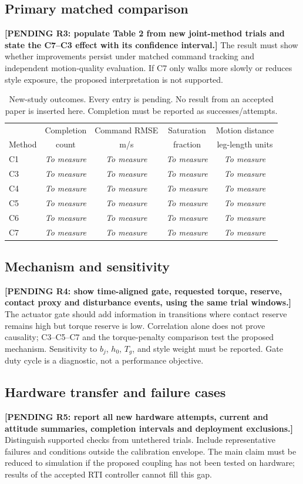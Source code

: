 \documentclass[11pt,a4paper]{article}
\newcommand{\pending}[1]{\textbf{[PENDING #1]}}
\newcommand{\TBC}{\textit{To measure}}
\begin{document}
\subsection{Primary matched comparison}
\pending{R3: populate Table 2 from new joint-method trials and state the C7--C3 effect with its confidence interval.} The result must show whether improvements persist under matched command tracking and independent motion-quality evaluation. If C7 only walks more slowly or reduces style exposure, the proposed interpretation is not supported.
\begin{table}[ht]
\centering\small
\caption{New-study outcomes. Every entry is pending. No result from an accepted paper is inserted here. Completion must be reported as successes/attempts.}
\begin{tabular}{lcccc}
\toprule & Completion & Command RMSE & Saturation & Motion distance\\
Method & count & m/s & fraction & leg-length units\\\midrule
C1 & \TBC & \TBC & \TBC & \TBC\\
C3 & \TBC & \TBC & \TBC & \TBC\\
C4 & \TBC & \TBC & \TBC & \TBC\\
C5 & \TBC & \TBC & \TBC & \TBC\\
C6 & \TBC & \TBC & \TBC & \TBC\\
C7 & \TBC & \TBC & \TBC & \TBC\\\bottomrule
\end{tabular}
\end{table}

\subsection{Mechanism and sensitivity}
\pending{R4: show time-aligned gate, requested torque, reserve, contact proxy and disturbance events, using the same trial windows.} The actuator gate should add information in transitions where contact reserve remains high but torque reserve is low. Correlation alone does not prove causality; C3--C5--C7 and the torque-penalty comparison test the proposed mechanism. Sensitivity to $b_j$, $h_0$, $T_g$, and style weight must be reported. Gate duty cycle is a diagnostic, not a performance objective.

\subsection{Hardware transfer and failure cases}
\pending{R5: report all new hardware attempts, current and attitude summaries, completion intervals and deployment exclusions.} Distinguish supported checks from untethered trials. Include representative failures and conditions outside the calibration envelope. The main claim must be reduced to simulation if the proposed coupling has not been tested on hardware; results of the accepted RTI controller cannot fill this gap.
\end{document}
